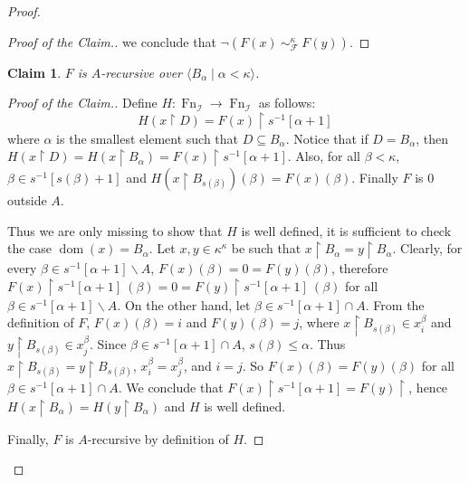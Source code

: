 \documentclass[10pt,a4paper]{amsart}
\newtheorem{claim}{Claim}
\DeclareMathOperator{\Fn}{Fn}
\newcommand{\I}{\mathcal{I}}
\DeclareMathOperator{\dom}{dom}
\newcommand{\seq}[2]{\langle #1 \mid #2 \rangle}
\begin{document}
\begin{proof}
\begin{proof}[Proof of the Claim.]
        we conclude that $\neg(F(x)\ \sim^\kappa_\mathcal{F}\ F(y))$.
    \end{proof}
    \begin{claim}
        $F$ is $A$-recursive over $\seq{B_\alpha}{\alpha<\kappa}$.
    \end{claim}
    \begin{proof}[Proof of the Claim.]
    Define $H:\Fn_{\I}\rightarrow \Fn_{\I}$ as follows:
        $$H(x\restriction D)=F(x)\restriction s^{-1}[\alpha+1]$$%
    where $\alpha$ is the smallest element such that $D\subseteq B_\alpha$.
    Notice that if $D=B_\alpha$, then $H(x\restriction D)=H(x\restriction B_\alpha)= F(x)\restriction s^{-1}[\alpha+1]$. Also, for all $\beta<\kappa$, $\beta\in s^{-1}[s(\beta)+1]$ and $H(x\restriction B_{s(\beta)})(\beta)=F(x)(\beta)$. Finally $F$ is 0 outside $A$. 

   Thus we are only missing to show that $H$ is well defined, it is sufficient to check the case $\dom(x)=B_\alpha$. Let $x,y\in \kappa^{\kappa}$ be such that $x\restriction B_\alpha=y\restriction B_\alpha$. 
    Clearly, for every $\beta\in s^{-1}[\alpha+1]\backslash A$, $F(x)(\beta)=0=F(y)(\beta)$, therefore $F(x)\restriction s^{-1}[\alpha+1]\ (\beta)=0=F(y)\restriction s^{-1}[\alpha+1]\ (\beta)$ for all $\beta\in s^{-1}[\alpha+1]\backslash A$.
    On the other hand, let $\beta\in s^{-1}[\alpha+1]\cap A$. From the definition of $F$, $F(x)(\beta)=i$ and $F(y)(\beta)=j$, where $x\restriction B_{s(\beta)}\in x_i^\beta$ and $y\restriction B_{s(\beta)}\in x_j^\beta$. Since $\beta\in s^{-1}[\alpha+1]\cap A$, $s(\beta)\leq \alpha$. Thus $x\restriction B_{s(\beta)}=y\restriction B_{s(\beta)}$, $x_i^\beta=x_j^\beta$, and $i=j$. 
    So $F(x) (\beta)=F(y) (\beta)$ for all $\beta\in s^{-1}[\alpha+1]\cap A$. We conclude that $F(x)\restriction s^{-1}[\alpha+1] =F(y)\restriction $, hence $H(x\restriction B_\alpha)=H(y\restriction B_\alpha)$ and $H$ is well defined.

   Finally, $F$ is $A$-recursive by definition of \(H\). 
    \end{proof}
    

\end{proof}
\end{document}
